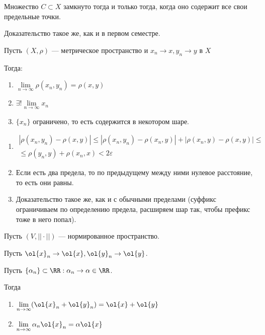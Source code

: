 \begin{thrm}{}{}
    Множество \( C \subset X \) замкнуто тогда и только тогда, когда оно содержит все свои предельные точки.
\end{thrm}

Доказательство такое же, как и в первом семестре.

\begin{thrm}{}{}
    Пусть \( (X, \rho) \) --- метрическое пространство и \( x_n \to x, y_n \to y \) в \( X \)

    Тогда:
    \begin{enumerate}
        \item
            \( \lim\limits_{n \to \infty} \rho(x_n, y_n) = \rho(x, y) \)
        \item
            \( \exists! \lim\limits_{n \to \infty} x_n \)
        \item
            \( \{ x_n \} \) ограничено, то есть содержится в некотором шаре.
    \end{enumerate}
\end{thrm}

\begin{enumerate}
    \item
        \begin{gather*}
            | \rho(x_n, y_n) - \rho(x, y) |
            \leq
            | \rho(x_n, y_n) - \rho(x_n, y) | + | \rho(x_n, y) - \rho(x, y) |
            \leq
            \\
            \leq
            \rho(y_n, y) + \rho(x_n, x)
            <
            2 \varepsilon
        \end{gather*}
    \item
        Если есть два предела, то по предыдущему между ними нулевое расстояние,
        то есть они равны.
    \item
        Доказательство такое же, как и с обычными пределами (суффикс ограничиваем по определению предела,
        расширяем шар так, чтобы префикс тоже в него попал).
\end{enumerate}

\begin{thrm}{}{}
    Пусть \( (V, || \cdot ||) \) --- нормированное пространство.

    Пусть \( \ol{x}_n \to \ol{x}, \ol{y}_n \to \ol{y} \).

    Пусть \( \{ \alpha_n \} \subset \RR : \alpha_n \to \alpha \in \RR \).

    Тогда
    \begin{enumerate}
        \item
            \( \lim\limits_{n \to \infty} (\ol{x}_n + \ol{y}_n) = \ol{x} + \ol{y} \)
        \item
            \( \lim\limits_{n \to \infty} \alpha_n \ol{x}_n = \alpha \ol{x} \)
    \end{enumerate}
\end{thrm}

